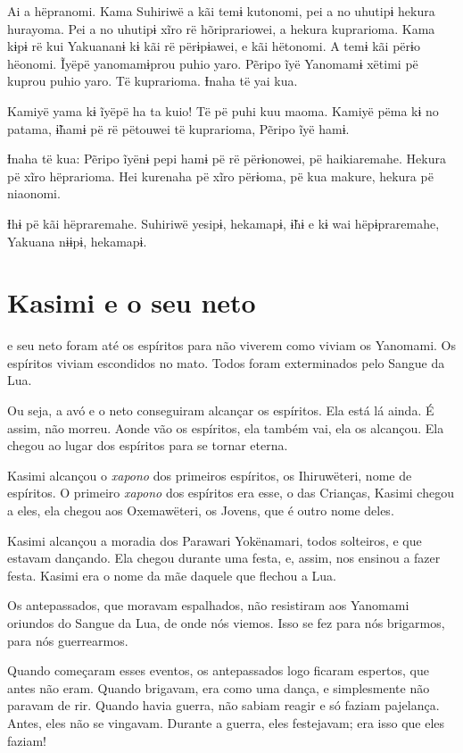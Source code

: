 Ai a hëpranomi. Kama Suhiriwë a kãi temɨ kutonomi, pei a no uhutipɨ
hekura hurayoma. Pei a no uhutipɨ xĩro rë hõriprariowei, a hekura
kuprarioma. Kama kɨpɨ rë kui Yakuananɨ kɨ kãi rë përɨpɨawei, e kãi
hëtonomi. A temɨ kãi përɨo hëonomi. Ĩyëpë yanomamɨprou puhio yaro.
Pẽripo ĩyë Yanomamɨ xëtimi pë kuprou puhio yaro. Të kuprarioma. Ɨnaha të
yai kua.

Kamiyë yama kɨ ĩyëpë ha ta kuio! Të pë puhi kuu maoma. Kamiyë pëma kɨ no
patama, ɨ̃hamɨ pë rë pëtouwei të kuprarioma, Pẽripo ĩyë hamɨ. 

Ɨnaha të kua: Pẽripo ĩyënɨ pepi hamɨ pë rë përɨonowei, pë haikiaremahe.
Hekura pë xĩro hëprarioma. Hei kurenaha pë xĩro përɨoma, pë kua makure,
hekura pë niaonomi. 

Ɨhɨ pë kãi hëpraremahe. Suhiriwë yesipɨ, hekamapɨ, ɨ̃hɨ e kɨ wai
hëpɨpraremahe, Yakuana nɨɨpɨ, hekamapɨ.

\chapter{Kasimi e o seu neto}

 e seu neto foram até os espíritos para não viverem como viviam
os Yanomami. Os espíritos viviam escondidos no mato. Todos foram
exterminados pelo Sangue da Lua.

Ou seja, a avó e o neto conseguiram alcançar os espíritos. Ela está lá ainda. É assim, não morreu. Aonde vão os espíritos, ela também vai, ela os
alcançou. Ela chegou ao lugar dos espíritos para se tornar eterna. 

Kasimi alcançou o \textit{xapono} dos primeiros espíritos, os Ihiruwëteri, nome
de espíritos. O primeiro \textit{xapono} dos espíritos era esse, o das
Crianças, Kasimi chegou a eles, ela chegou aos
Oxemawëteri, os Jovens, que é outro nome deles. 

Kasimi alcançou a moradia dos Parawari Yokënamari, todos solteiros, e que
estavam dançando. Ela chegou durante uma festa, e, assim, nos ensinou a
fazer festa. Kasimi era o nome da mãe daquele que flechou a Lua.

Os antepassados, que moravam espalhados, não resistiram aos Yanomami
oriundos do Sangue da Lua, de onde nós viemos. Isso se fez para nós
brigarmos, para nós guerrearmos. 

Quando começaram esses eventos, os antepassados logo ficaram espertos,
que antes não eram. Quando brigavam, era como uma dança, e
simplesmente não paravam de rir. Quando havia guerra, não sabiam reagir
e só faziam pajelança. Antes, eles não se vingavam.
Durante a guerra, eles festejavam; era isso que eles faziam! 

